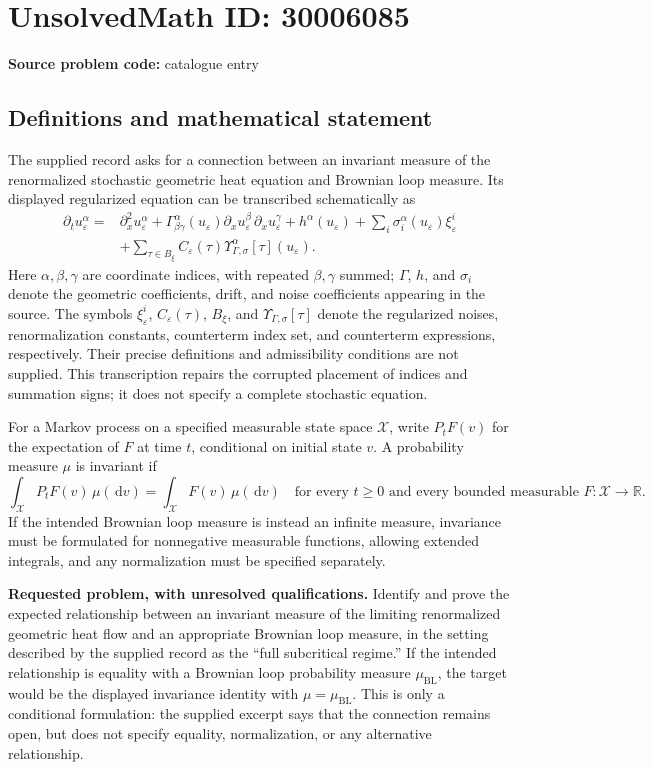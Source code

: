 \documentclass[11pt]{article}
\newcommand{\R}{\mathbb{R}}
\newcommand{\dd}{\,\mathrm{d}}
\begin{document}
\section*{UnsolvedMath ID: 30006085}
\textbf{Source problem code:} catalogue entry
\subsection{Definitions and mathematical statement}
The supplied record asks for a connection between an invariant measure of the renormalized stochastic geometric heat equation and Brownian loop measure. Its displayed regularized equation can be transcribed schematically as
\[
\begin{aligned}
\partial_t u_\varepsilon^\alpha
={}&\partial_x^2u_\varepsilon^\alpha
+\Gamma^\alpha_{\beta\gamma}(u_\varepsilon)
\partial_xu_\varepsilon^\beta\,\partial_xu_\varepsilon^\gamma
+h^\alpha(u_\varepsilon)
+\sum_i\sigma_i^\alpha(u_\varepsilon)\xi_\varepsilon^i\\
&+\sum_{\tau\in B_\xi}C_\varepsilon(\tau)
\Upsilon^\alpha_{\Gamma,\sigma}[\tau](u_\varepsilon).
\end{aligned}
\]
Here \(\alpha,\beta,\gamma\) are coordinate indices, with repeated \(\beta,\gamma\) summed; \(\Gamma\), \(h\), and \(\sigma_i\) denote the geometric coefficients, drift, and noise coefficients appearing in the source. The symbols \(\xi_\varepsilon^i\), \(C_\varepsilon(\tau)\), \(B_\xi\), and \(\Upsilon_{\Gamma,\sigma}[\tau]\) denote the regularized noises, renormalization constants, counterterm index set, and counterterm expressions, respectively. Their precise definitions and admissibility conditions are not supplied. This transcription repairs the corrupted placement of indices and summation signs; it does not specify a complete stochastic equation.

For a Markov process on a specified measurable state space \(\mathcal X\), write \(P_tF(v)\) for the expectation of \(F\) at time \(t\), conditional on initial state \(v\). A probability measure \(\mu\) is invariant if
\[
\int_{\mathcal X}P_tF(v)\,\mu(\dd v)
=\int_{\mathcal X}F(v)\,\mu(\dd v)
\quad\text{for every }t\geq0
\text{ and every bounded measurable }F:\mathcal X\to\R.
\]
If the intended Brownian loop measure is instead an infinite measure, invariance must be formulated for nonnegative measurable functions, allowing extended integrals, and any normalization must be specified separately.

\textbf{Requested problem, with unresolved qualifications.} Identify and prove the expected relationship between an invariant measure of the limiting renormalized geometric heat flow and an appropriate Brownian loop measure, in the setting described by the supplied record as the ``full subcritical regime.'' If the intended relationship is equality with a Brownian loop probability measure \(\mu_{\mathrm{BL}}\), the target would be the displayed invariance identity with \(\mu=\mu_{\mathrm{BL}}\). This is only a conditional formulation: the supplied excerpt says that the connection remains open, but does not specify equality, normalization, or any alternative relationship.
\end{document}
